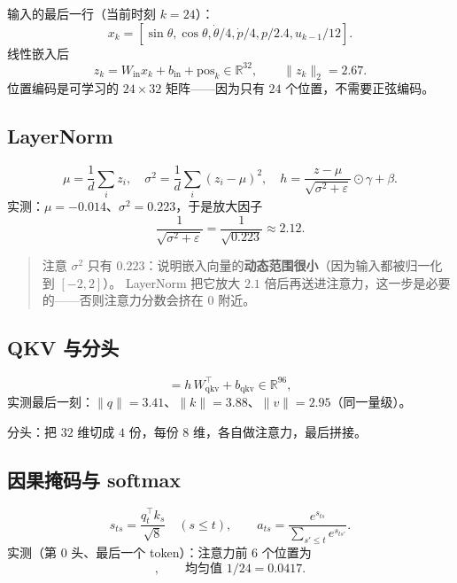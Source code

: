 输入的最后一行（当前时刻 $k=24$）：
\begin{equation}
  x_k=[\sin\theta,\cos\theta,\dot\theta/4,\dot p/4,p/2.4,u_{k-1}/12] .
\end{equation}
线性嵌入后
\begin{equation}
  z_k=W_{\text{in}}x_k+b_{\text{in}}+\text{pos}_k\in\mathbb{R}^{32},
  \qquad \|z_k\|_2=2.67 .
\end{equation}
位置编码是可学习的 $24\times32$ 矩阵——因为只有 $24$ 个位置，不需要正弦编码。

\subsection{LayerNorm}

\begin{equation}
  \mu=\frac1d\sum_iz_i,\quad
  \sigma^2=\frac1d\sum_i(z_i-\mu)^2,\quad
  h=\frac{z-\mu}{\sqrt{\sigma^2+\varepsilon}}\odot\gamma+\beta .
\end{equation}
实测：$\mu=-0.014$、$\sigma^2=0.223$，于是放大因子
\begin{equation}
  \frac{1}{\sqrt{\sigma^2+\varepsilon}}=\frac{1}{\sqrt{0.223}}\approx2.12 .
\end{equation}

\begin{quote}
注意 $\sigma^2$ 只有 $0.223$：说明嵌入向量的\textbf{动态范围很小}（因为输入都被归一化到 $[-2,2]$）。
LayerNorm 把它放大 $2.1$ 倍后再送进注意力，这一步是必要的——否则注意力分数会挤在 $0$ 附近。
\end{quote}

\subsection{QKV 与分头}

\begin{equation}
  [Q;K;V]=h\,W_{\text{qkv}}^\top+b_{\text{qkv}}\in\mathbb{R}^{96},
\end{equation}
实测最后一刻：$\|q\|=3.41$、$\|k\|=3.88$、$\|v\|=2.95$（同一量级）。

分头：把 $32$ 维切成 $4$ 份，每份 $8$ 维，各自做注意力，最后拼接。

\subsection{因果掩码与 softmax}

\begin{equation}
  s_{ts}=\frac{q_t^\top k_s}{\sqrt 8}\quad(s\le t),\qquad
  a_{ts}=\frac{e^{s_{ts}}}{\sum_{s'\le t}e^{s_{ts'}}} .
\end{equation}
实测（第 0 头、最后一个 token）：注意力前 $6$ 个位置为
\begin{equation}
  [\,0.040,\ 0.039,\ 0.042,\ 0.042,\ 0.044,\ 0.043\,],
  \qquad \text{均匀值 }1/24=0.0417 .
\end{equation}

